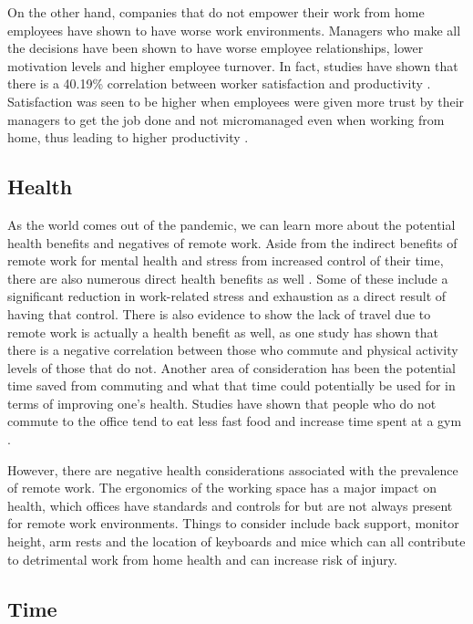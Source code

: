 \documentclass[12pt]{article}
\begin{document}
On the other hand, companies that do not empower their work from home employees have shown to have worse work environments. Managers who make all the decisions have been shown to have worse employee relationships, lower motivation levels and higher employee turnover. In fact, studies have shown that there is a 40.19\% correlation between worker satisfaction and productivity \cite{sultana2021exploring}. Satisfaction was seen to be higher when employees were given more trust by their managers to get the job done and not micromanaged even when working from home, thus leading to higher productivity \cite{sultana2021exploring}.

\subsection*{Health}

As the world comes out of the pandemic, we can learn more about the potential health benefits and negatives of remote work. Aside from the indirect benefits of remote work for mental health and stress from increased control of their time, there are also numerous direct health benefits as well \cite{doi:10.1177/1529100615593273}. Some of these include a significant reduction in work-related stress and exhaustion as a direct result of having that control. There is also evidence to show the lack of travel due to remote work is actually a health benefit as well, as one study has shown that there is a negative correlation between those who commute and physical activity levels of those that do not\cite{HOEHNER2012571}. Another area of consideration has been the potential time saved from commuting and what that time could potentially be used for in terms of improving one's health. Studies have shown that people who do not commute to the office tend to eat less fast food and increase time spent at a gym \cite{allen2008workplace}.

However, there are negative health considerations associated with the prevalence of remote work. The ergonomics of the working space has a major impact on health, which offices have standards and controls for but are not always present for remote work environments. Things to consider include back support, monitor height, arm rests and the location of keyboards and mice which can all contribute to detrimental work from home health and can increase risk of injury\cite{ellison2012ergonomics}. 

\subsection*{Time}
\end{document}
